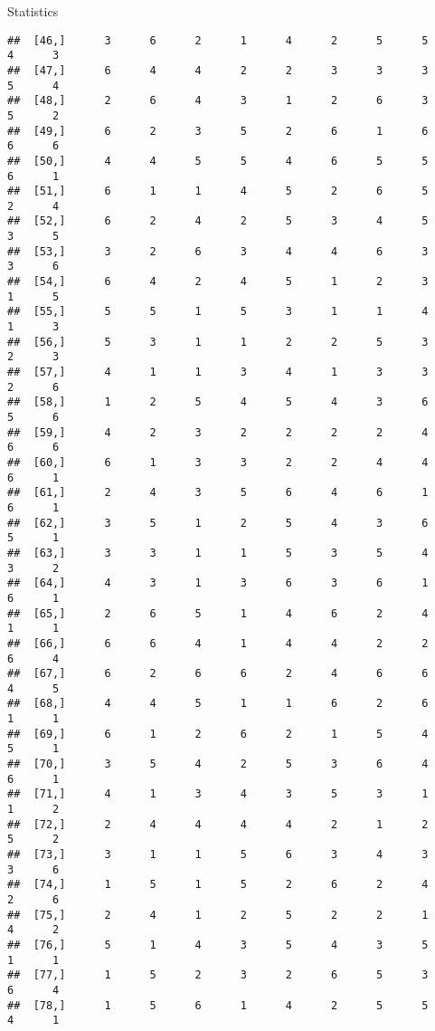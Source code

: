 \documentclass[
  ignorenonframetext,
]{beamer}
\begin{document}
\begin{frame}[fragile]{Statistics}
\begin{verbatim}
##  [46,]      3      6      2      1      4      2      5      5      4      3
##  [47,]      6      4      4      2      2      3      3      3      5      4
##  [48,]      2      6      4      3      1      2      6      3      5      2
##  [49,]      6      2      3      5      2      6      1      6      6      6
##  [50,]      4      4      5      5      4      6      5      5      6      1
##  [51,]      6      1      1      4      5      2      6      5      2      4
##  [52,]      6      2      4      2      5      3      4      5      3      5
##  [53,]      3      2      6      3      4      4      6      3      3      6
##  [54,]      6      4      2      4      5      1      2      3      1      5
##  [55,]      5      5      1      5      3      1      1      4      1      3
##  [56,]      5      3      1      1      2      2      5      3      2      3
##  [57,]      4      1      1      3      4      1      3      3      2      6
##  [58,]      1      2      5      4      5      4      3      6      5      6
##  [59,]      4      2      3      2      2      2      2      4      6      6
##  [60,]      6      1      3      3      2      2      4      4      6      1
##  [61,]      2      4      3      5      6      4      6      1      6      1
##  [62,]      3      5      1      2      5      4      3      6      5      1
##  [63,]      3      3      1      1      5      3      5      4      3      2
##  [64,]      4      3      1      3      6      3      6      1      6      1
##  [65,]      2      6      5      1      4      6      2      4      1      1
##  [66,]      6      6      4      1      4      4      2      2      6      4
##  [67,]      6      2      6      6      2      4      6      6      4      5
##  [68,]      4      4      5      1      1      6      2      6      1      1
##  [69,]      6      1      2      6      2      1      5      4      5      1
##  [70,]      3      5      4      2      5      3      6      4      6      1
##  [71,]      4      1      3      4      3      5      3      1      1      2
##  [72,]      2      4      4      4      4      2      1      2      5      2
##  [73,]      3      1      1      5      6      3      4      3      3      6
##  [74,]      1      5      1      5      2      6      2      4      2      6
##  [75,]      2      4      1      2      5      2      2      1      4      2
##  [76,]      5      1      4      3      5      4      3      5      1      1
##  [77,]      1      5      2      3      2      6      5      3      6      4
##  [78,]      1      5      6      1      4      2      5      5      4      1

\end{verbatim}
\end{frame}
\end{document}
